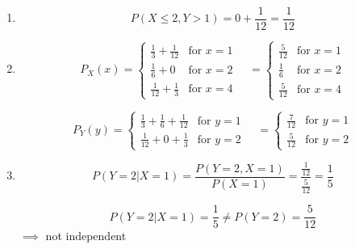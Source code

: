 \begin{problem}{1} $ $
\begin{enumerate}
	\item
	\begin{equation*}
	P(X \le 2, Y>1) = 0+\frac{1}{12}=\frac{1}{12}
	\end{equation*}
	
	\item
	
	\begin{equation*}  
  P_X(x) = \begin{cases}
                                   \frac{1}{3}+\frac{1}{12} & \text{for $x = 1$} \\
                                   \frac{1}{6}+0 & \text{for $x = 2$} \\
                                   \frac{1}{12}+\frac{1}{3} & \text{for $x = 4$} 
       \end{cases} \quad
= \begin{cases}
                                   \frac{5}{12} & \text{for $x = 1$} \\
                                   \frac{1}{6} & \text{for $x = 2$} \\
                                   \frac{5}{12} & \text{for $x = 4$} 
       \end{cases}
\end{equation*}

	\begin{equation*}  
  P_Y(y) = \begin{cases}
                                   \frac{1}{3}+\frac{1}{6}+\frac{1}{12} & \text{for $y = 1$} \\
                                   \frac{1}{12}+0+\frac{1}{3} & \text{for $y = 2$} 
       \end{cases} \quad
= \begin{cases}
                                   \frac{7}{12} & \text{for $y = 1$} \\
                                   \frac{5}{12} & \text{for $y = 2$} 
       \end{cases}
\end{equation*}

\item

	\begin{equation*}
	P(Y=2 |X=1) = \frac{P(Y=2, X=1)}{P(X=1)}=\frac{\frac{1}{12}}{\frac{5}{12}}=\frac{1}{5}
	\end{equation*}

	\begin{equation*}
	P(Y=2 |X=1) =\frac{1}{5} \neq P(Y=2) = \frac{5}{12}
	\end{equation*}
	$\implies$ not independent
	


\end{enumerate}
\end{problem}





